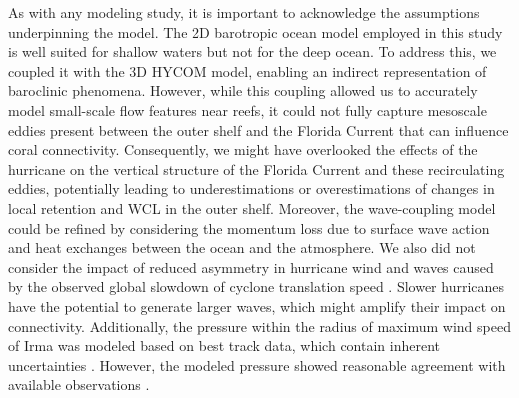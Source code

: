 \documentclass[fleqn,10pt]{wlscirep}
\newcommand{\modif}[1]{{#1}}
\begin{document}
As with any modeling study, it is important to acknowledge the assumptions underpinning the model. The 2D barotropic ocean model employed in this study is well suited for shallow waters but not for the deep ocean. To address this, we coupled it with the 3D HYCOM model, enabling an indirect representation of baroclinic phenomena. However, while this coupling allowed us to accurately model small-scale flow features near reefs, it could not fully capture mesoscale eddies present between the outer shelf and the Florida Current that can influence coral connectivity. Consequently, we might have overlooked the effects of the hurricane on the vertical structure of the Florida Current \citep{ezer2018interaction} and these recirculating eddies, potentially leading to underestimations or overestimations of changes in local retention and WCL in the outer shelf. Moreover, the wave-coupling model could be refined by considering the momentum loss due to surface wave action and heat exchanges between the ocean and the atmosphere. \modif{We also did not consider the impact of reduced asymmetry in hurricane wind and waves caused by the observed global slowdown of cyclone translation speed \citep{kossin2018global}. Slower hurricanes have the potential to generate larger waves, which might amplify their impact on connectivity. Additionally, the pressure within the radius of maximum wind speed of Irma was modeled based on best track data, which contain inherent uncertainties \citep{torn2012uncertainty}. However, the modeled pressure showed reasonable agreement with available observations \citep{DobbyIrma}}.
\end{document}
